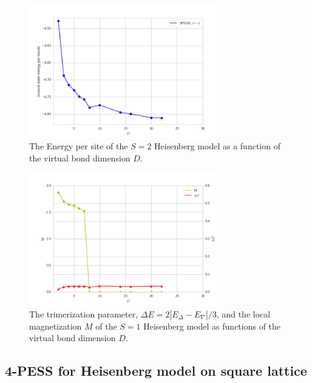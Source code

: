 \begin{figure}[H]
	\centering
	\includegraphics[width=0.75\textwidth]{figures/3pess_S2GE.png}
	\caption[The Energy per site of the $S=2$ Heisenberg model as a function of the virtual bond dimension $D$]{The Energy per site of the $S=2$ Heisenberg model as a function of the virtual bond dimension $D$.}
	\label{fig4330}
\end{figure}

\begin{figure}[H]
	\centering
	\includegraphics[width=0.75\textwidth]{figures/3pess_S2M.png}
	\caption[The trimerization parameter, $\Delta E = 2 |E_{\Delta}-E_{\nabla}| / 3$, and the local magnetization $M$ of the $S=1$ Heisenberg model as functions of the virtual bond dimension $D$]{The trimerization parameter, $\Delta E = 2 |E_{\Delta}-E_{\nabla}| / 3$, and the local magnetization $M$ of the $S=1$ Heisenberg model as functions of the virtual bond dimension $D$.}
	\label{fig4331}
\end{figure}

\subsection{4-PESS for Heisenberg model on square lattice}

